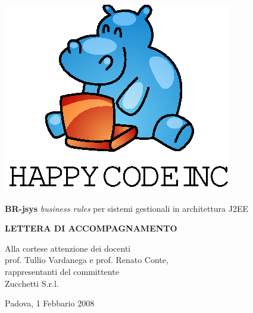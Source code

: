 \documentclass[11pt,titlepage,a4paper]{report}
\begin{document}
\begin{titlepage}
\begin{center}
\vspace*{0.5in}
\includegraphics{logo.eps}
\vspace*{0.2in}

{\Large \textbf{BR-jsys}}
{\Large \emph{business rules} per sistemi gestionali in architettura J2EE } 
\vspace{2in}

\LARGE \textbf {LETTERA DI ACCOMPAGNAMENTO}

\end{center}
\end{titlepage}
\vspace*{0.5in}


\thispagestyle{plain}
\begin{flushright}
Alla cortese attenzione dei docenti\\
prof. Tullio Vardanega e prof. Renato Conte,\\
rappresentanti del committente\\
Zucchetti S.r.l.
\end{flushright}
Padova, 1 Febbario 2008\\
\end{document}
